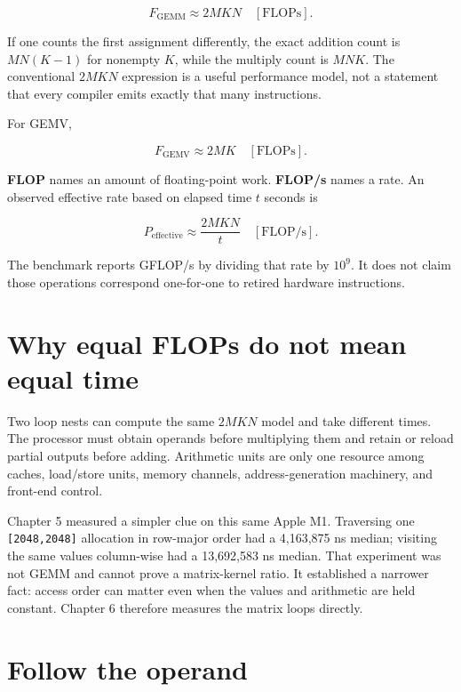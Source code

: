 \begin{equation}
F_{\mathrm{GEMM}}\approx2MKN\quad[\mathrm{FLOPs}].
\end{equation}

If one counts the first assignment differently, the exact addition count
is \(MN(K-1)\) for nonempty \(K\), while the multiply count is \(MNK\).
The conventional \(2MKN\) expression is a useful performance model, not
a statement that every compiler emits exactly that many instructions.

For GEMV,

\begin{equation}
F_{\mathrm{GEMV}}\approx2MK\quad[\mathrm{FLOPs}].
\end{equation}

\textbf{FLOP} names an amount of floating-point work. \textbf{FLOP/s}
names a rate. An observed effective rate based on elapsed time \(t\)
seconds is

\begin{equation}
P_{\mathrm{effective}}
\approx\frac{2MKN}{t}\quad[\mathrm{FLOP/s}].
\end{equation}

The benchmark reports GFLOP/s by dividing that rate by \(10^9\). It does
not claim those operations correspond one-for-one to retired hardware
instructions.

\section{Why equal FLOPs do not mean equal
time}\label{why-equal-flops-do-not-mean-equal-time}

Two loop nests can compute the same \(2MKN\) model and take different
times. The processor must obtain operands before multiplying them and
retain or reload partial outputs before adding. Arithmetic units are
only one resource among caches, load/store units, memory channels,
address-generation machinery, and front-end control.

Chapter 5 measured a simpler clue on this same Apple M1. Traversing one
\texttt{{[}2048,2048{]}} allocation in row-major order had a 4,163,875
ns median; visiting the same values column-wise had a 13,692,583 ns
median. That experiment was not GEMM and cannot prove a matrix-kernel
ratio. It established a narrower fact: access order can matter even when
the values and arithmetic are held constant. Chapter 6 therefore
measures the matrix loops directly.

\section{Follow the operand}\label{follow-the-operand}

